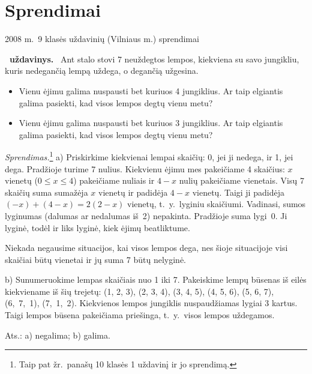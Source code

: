 \documentclass[11pt,a4paper]{article}
\newcounter{uzdavinys}
\newenvironment{uzdavinys}
  {\refstepcounter{uzdavinys}\par\medskip\noindent\textbf{\theuzdavinys\ uždavinys.}\ }
  {\par\medskip}
\begin{document}
\clearpage

\section*{Sprendimai}

\begin{center}\label{dvu}
{\sc\large 2008 m.~9 klasės uždavinių (Vilniaus m.) sprendimai}
\end{center}
\vspace{0,3cm}


\setcounter{uzdavinys}{0}


\begin{uzdavinys}
Ant stalo stovi 7 neuždegtos lempos, kiekviena su savo jungikliu, kuris nedegančią lempą uždega, o degančią užgesina.
\begin{itemize}
\item[a)] Vienu ėjimu galima nuspausti bet kuriuos 4 jungiklius. Ar taip elgiantis galima pasiekti, kad visos lempos degtų vienu metu?
\item[b)] Vienu ėjimu galima nuspausti bet kuriuos 3 jungiklius. Ar taip elgiantis galima pasiekti, kad visos lempos degtų vienu metu?
\end{itemize}
\end{uzdavinys}
       
\textit{Sprendimas.}\footnote{Taip pat žr.~panašų 10 klasės 1 uždavinį ir jo sprendimą.} a) Priskirkime kiekvienai lempai skaičių: 0, jei ji nedega, ir 1, jei dega. Pradžioje turime 7 nulius. Kiekvienu ėjimu mes pakeičiame 4 skaičius: $x$ vienetų ($0\leq x\leq4$) pakeičiame nuliais ir $4-x$ nulių pakeičiame vienetais. Visų 7 skaičių suma sumažėja $x$ vienetų ir padidėja $4-x$ vienetų. Taigi ji padidėja $(-x)+(4-x)=2(2-x)$ vienetų, t.~y.~lyginiu skaičiumi. Vadinasi, sumos lyginumas (dalumas ar nedalumas iš~2) nepakinta. Pradžioje suma lygi~0. Ji lyginė, todėl ir liks lyginė, kiek ėjimų beatliktume.

Niekada negausime situacijos, kai visos lempos dega, nes šioje situacijoje visi skaičiai būtų vienetai ir jų suma 7 būtų nelyginė.

b) Sunumeruokime lempas skaičiais nuo 1 iki 7. Pakeiskime lempų būsenas iš eilės kiekviename iš šių trejetų: (1, 2, 3), (2, 3, 4), (3, 4, 5), (4, 5, 6), (5, 6, 7), (6,~7,~1), (7,~1,~2). Kiekvienos lempos jungiklis nuspaudžiamas lygiai 3 kartus. Taigi lempos būsena pakeičiama priešinga, t.~y.~visos lempos uždegamos.

\begin{flushright}
     Ats.: a) negalima; b) galima.
\end{flushright}
 \vspace{0,3cm}  
\end{document}
